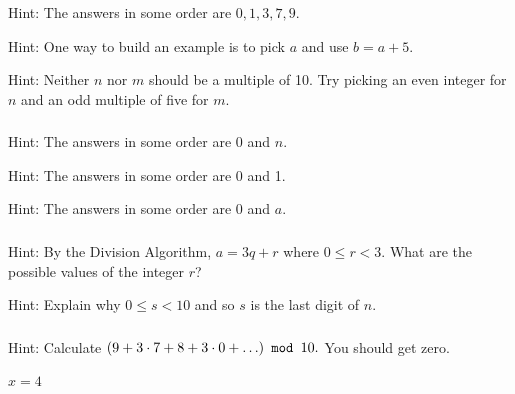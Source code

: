 \subsubsection*{ \answers}
\begin{apart}
    \item Hint: The answers in some order are $0,1,3,7,9$.
    \item Hint: One way to build an example is to pick $a$ and use $b=a+5$.
    \item Hint: Neither $n$ nor $m$ should be a multiple of 10.  Try picking an even integer for $n$ and an odd multiple of five for $m$.
\end{apart}

\subsubsection*{ \answers}
\begin{apart}
    \item Hint: The answers in some order are 0 and $n$.
    \item Hint: The answers in some order are 0 and 1.
    \item Hint: The answers in some order are 0 and $a$.
\end{apart}

\subsubsection*{ \answers}
\begin{apart}
    \item Hint: By the Division Algorithm, $a=3q+r$ where $0 \le r < 3$.  What are the possible values of the integer $r$?
    \item Hint: Explain why $0 \le s < 10$ and so $s$ is the last digit of $n$.
\end{apart}

\subsubsection*{ \answers}
\begin{apart}
    \item Hint: Calculate $(9 + 3 \cdot 7 +8 + 3 \cdot 0 + \ldots ) \texttt{ mod } 10.$  You should get zero.
    \item $x=4$
\end{apart}


